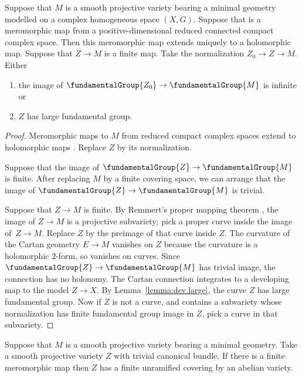 \begin{Lemma}\label{lemma:large}
Suppose that $M$ is a smooth projective variety bearing a minimal geometry modelled on a complex homogeneous space $(X, G)$.
Suppose that  is a meromorphic map from a positive-dimensional reduced connected compact complex space.
Then this meromorphic map extends uniquely to a holomorphic map.
Suppose that $Z \to M$ is a finite map.
Take the normalization $Z_0 \to Z \to M$.
Either
\begin{enumerate}\itemsep=0pt
\item[$(1)$]
the image of $\fundamentalGroup{Z_0} \to \fundamentalGroup{M}$ is infinite or
\item[$(2)$]
$Z$ has large fundamental group.
\end{enumerate}
\end{Lemma}

\begin{proof}
Meromorphic maps to $M$ from reduced compact complex spaces extend to holomorphic maps \cite[Lemma 26]{Biswas.McKay:2016}.
Replace $Z$ by its normalization.

Suppose that the image of $\fundamentalGroup{Z} \to \fundamentalGroup{M}$ is finite.
After replacing $M$ by a finite covering space, we can arrange that the image of $\fundamentalGroup{Z}
\to \fundamentalGroup{M}$ is trivial.

Suppose that $Z \to M$ is finite.
By Remmert's proper mapping theorem \cite[p.~213]{Grauert.Remmert:1984}, the image of $Z
 \to M$ is a projective subvariety;
pick a proper curve inside the image of~${Z \to M}$.
Replace $Z$ by the preimage of that curve inside $Z$.
The curvature of the Cartan geometry ${E \to M}$ vanishes on $Z$ because the curvature is a holomorphic $2$-form, so vanishes on curves.
Since $\fundamentalGroup{Z} \to \fundamentalGroup{M}$ has trivial image, the connection has no holonomy.
The Cartan connection integrates to a developing map to the model $Z \to X$.
By Lemma~\ref{lemma:dev.large}, the curve $Z$ has large fundamental group.
Now if $Z$ is not a curve, and contains a subvariety whose normalization has
finite fundamental group image in $Z$, pick a curve in that subvariety.
\end{proof}

\begin{Corollary}\label{corollary:tori}
Suppose that $M$ is a smooth projective variety bearing a minimal geometry.
Take a smooth projective variety $Z$ with trivial canonical bundle.
If there is a finite meromorphic map  then $Z$ has a finite unramified covering by an abelian variety.
\end{Corollary}

